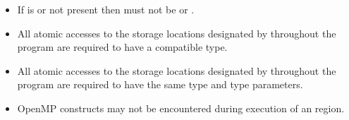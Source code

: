 \begin{samepage}
\begin{itemize}
\item If  is  or not present then 
    must not be  or .
\end{itemize}


\begin{ccppspecific}
\begin{itemize}
\item All atomic accesses to the storage locations designated by  throughout the program
are required to have a compatible type.
\end{itemize}
\end{ccppspecific}
\end{samepage}

\begin{fortranspecific}
\begin{itemize}
\item All atomic accesses to the storage locations designated by  throughout the program
are required to have the same type and type parameters.
\end{itemize}
\end{fortranspecific}


\begin{itemize}
\item OpenMP constructs may not be encountered during execution of an
 region.
\end{itemize}


